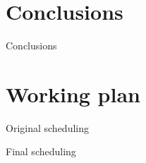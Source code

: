 \section{Conclusions}
\begin{frame}{Conclusions}
\end{frame}

\section{Working plan}
\begin{frame}{Original scheduling}
\centering
\vspace{1.4em}
\scalebox{0.25}{%

}
\end{frame}

\begin{frame}{Final scheduling}
\centering
\vspace{1.4em}
\scalebox{0.25}{
 
}
\end{frame}








%
%
%
%
%
%
%

%
%
%
%
%
%
%
%
%
%
%
%
%
%
%



